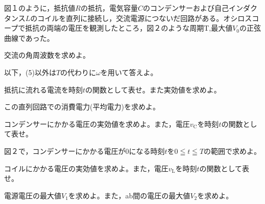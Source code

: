 \item
    図１のように，抵抗値$R$の抵抗，電気容量$C$のコンデンサーおよび自己インダクタンス$L$のコイルを直列に接続し，交流電源につないだ回路がある。オシロスコープで抵抗の両端の電圧を観測したところ，図２のような周期T,最大値$V_0$の正弦曲線であった。
    \begin{center}
        
        
    \end{center}
        \begin{Enumerate}
            \item 交流の角周波数を求めよ。
        \end{Enumerate}
    以下，(5)以外は$T$の代わりに$\omega$を用いて答えよ。
        \begin{Enumerate*}
            \item 抵抗に流れる電流を時刻$t$の関数として表せ。また実効値を求めよ。
            \item この直列回路での消費電力(平均電力)を求めよ。
            \item コンデンサーにかかる電圧の実効値を求めよ。また，電圧$v_\mathrm{C}$を時刻$t$の関数として表せ。
            \item 図２で，コンデンサーにかかる電圧が0になる時刻$t$を$0 \leqq t \leqq T$の範囲で求めよ。
            \item コイルにかかる電圧の実効値を求めよ。また，電圧$v_\mathrm{L}$を時刻$t$の関数として表せ。
            \item 電源電圧の最大値$V_1$を求めよ。また，ab間の電圧の最大値$V_2$を求めよ。
        \end{Enumerate*}

